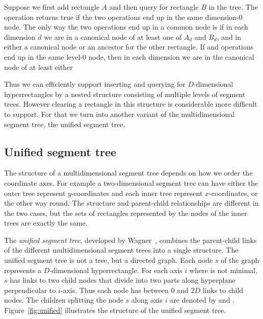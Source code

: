 \documentclass[english,gradu]{tktltiki2018}
\begin{document}
Suppose we first add rectangle $A$ and then query for rectangle $B$ in the tree.
The \checkdt operation returns true if the two operations end up in the same dimension-0 node.
The only way the two operations end up in a common node is if in each dimension $d$ we are in a canonical node of at least one of $A_d$ and $B_d$, and in either a canonical node or an ancestor for the other rectangle.
If \adddt{} and \checkdt{} operations end up in the same level-0 node, then in each dimension we are in the canonical node of at least either

Thus we can efficiently support inserting and querying for $D$-dimensional hyperrectangles by a nested structure consisting of multiple levels of segment trees.
However clearing a rectangle in this structure is considerable more difficult to support.
For that we turn into another variant of the multidimensional segment tree, the unified segment tree.

\subsection{Unified segment tree}\label{sec:unifiedtree}

The structure of a multidimensional segment tree depends on how we order the coordinate axes.
For example a two-dimensional segment tree can have either the outer tree represent $y$-coordinates and each inner tree represent $x$-coordinates, or the other way round.
The structure and parent-child relationships are different in the two cases, but the sets of rectangles represented by the nodes of the inner trees are exactly the same.

The \emph{unified segment tree}, developed by Wagner~\cite{unified}, combines the parent-child links of the different multidimensional segment trees into a single structure.
The unified segment tree is not a tree, but a directed graph.
Each node $s$ of the graph represents a $D$-dimensional hyperrectangle.
For each axis $i$ where  is not minimal, $s$ has links to two child nodes that divide  into two parts along hyperplane perpendicular to $i$-axis.
Thus each node has between 0 and $2D$ links to child nodes.
The children splitting the node $s$ along axis $i$ are denoted by  and .
Figure~\ref{fig:unified} illustrates the structure of the unified segment tree.
\end{document}
